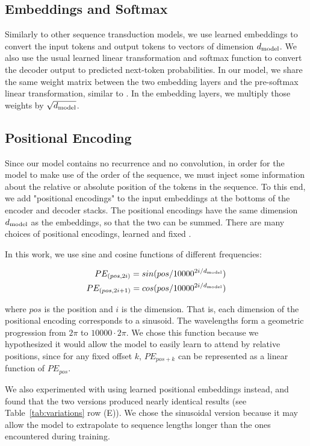 \subsection{Embeddings and Softmax}
Similarly to other sequence transduction models, we use learned embeddings to
convert the input tokens and output tokens to vectors of dimension $d_{\text{model}}$.
We also use the usual learned linear transformation and softmax function to
convert the decoder output to predicted next-token probabilities.  In our
model, we share the same weight matrix between the two embedding layers and the
pre-softmax linear transformation, similar to \citep{press2016using}.	In the
embedding layers, we multiply those weights by $\sqrt{d_{\text{model}}}$.

\subsection{Positional Encoding}
Since our model contains no recurrence and no convolution, in order for the
model to make use of the order of the sequence, we must inject some information
about the relative or absolute position of the tokens in the sequence.	To this
end, we add "positional encodings" to the input embeddings at the bottoms of
the encoder and decoder stacks.  The positional encodings have the same
dimension $d_{\text{model}}$ as the embeddings, so that the two can be summed.	There
are many choices of positional encodings, learned and fixed
\citep{JonasFaceNet2017}.

In this work, we use sine and cosine functions of different frequencies:

\begin{align*}
  PE_{(pos,2i)} = sin(pos / 10000^{2i/d_{\text{model}}}) \\
  PE_{(pos,2i+1)} = cos(pos / 10000^{2i/d_{\text{model}}})
\end{align*}

where $pos$ is the position and $i$ is the dimension.  That is, each dimension
of the positional encoding corresponds to a sinusoid.  The wavelengths form a
geometric progression from $2\pi$ to $10000 \cdot 2\pi$.  We chose this
function because we hypothesized it would allow the model to easily learn to
attend by relative positions, since for any fixed offset $k$, $PE_{pos+k}$ can
be represented as a linear function of $PE_{pos}$.

We also experimented with using learned positional embeddings
\citep{JonasFaceNet2017} instead, and found that the two versions produced
nearly identical results (see Table~\ref{tab:variations} row (E)).  We chose
the sinusoidal version because it may allow the model to extrapolate to
sequence lengths longer than the ones encountered during training.
